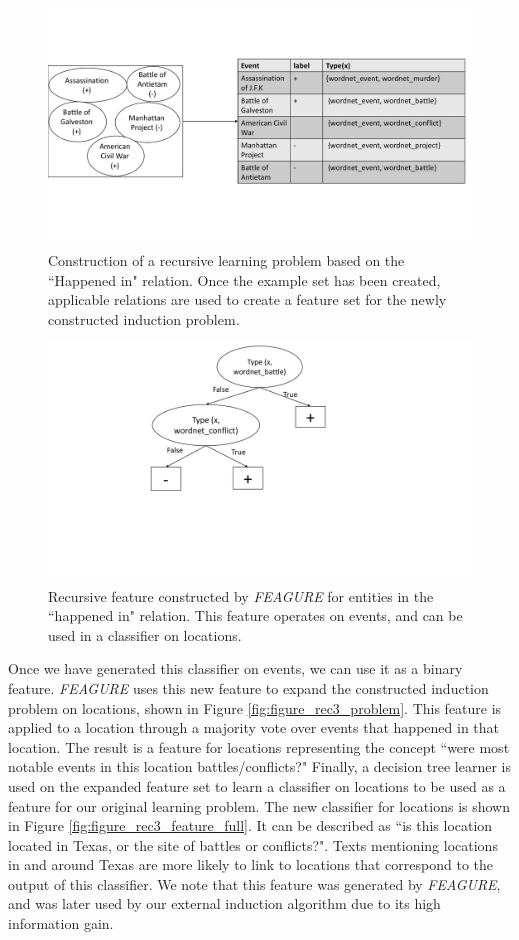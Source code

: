 \documentclass[letterpaper]{article} %
\theoremstyle{definition}
\begin{document}
\begin{figure}[!h]
	\centering
	\includegraphics[width=\linewidth]{figure_rec3_problem_rec_new}
	\caption{Construction of a recursive learning problem based on the ``Happened in" relation. Once the example set has been created, applicable relations are used to create a feature set for the newly constructed induction problem.}
	\label{fig:figure_rec3_problem_rec}
\end{figure}

\begin{figure}[!h]
	\centering
	\includegraphics[width=0.7\linewidth]{figure_rec3_feature_rec_new}
	\caption{Recursive feature constructed by \emph{FEAGURE} for entities in the ``happened in" relation. This feature operates on events, and can be used in a classifier on locations.}
	\label{fig:figure_rec3_feature}
\end{figure}

Once we have generated this classifier on events, we can use it as a binary feature. \emph{FEAGURE} uses this new feature to expand the constructed induction problem on locations, shown in Figure \ref{fig:figure_rec3_problem}.
This feature is applied to a location through a majority vote over events that happened in that location. The result is a feature for locations representing the concept ``were most notable events in this location battles/conflicts?"
Finally, a decision tree learner is used on the expanded feature set to learn a classifier on locations to be used as a feature for our original learning problem. The new classifier for locations is shown in Figure \ref{fig:figure_rec3_feature_full}. It can be described as ``is this location located in Texas, or the site of battles or conflicts?".
Texts mentioning locations in and around Texas are more likely to link to locations that correspond to the output of this classifier.
We note that this feature was generated by \emph{FEAGURE}, and was later used by our external induction algorithm due to its high information gain. 
\end{document}
